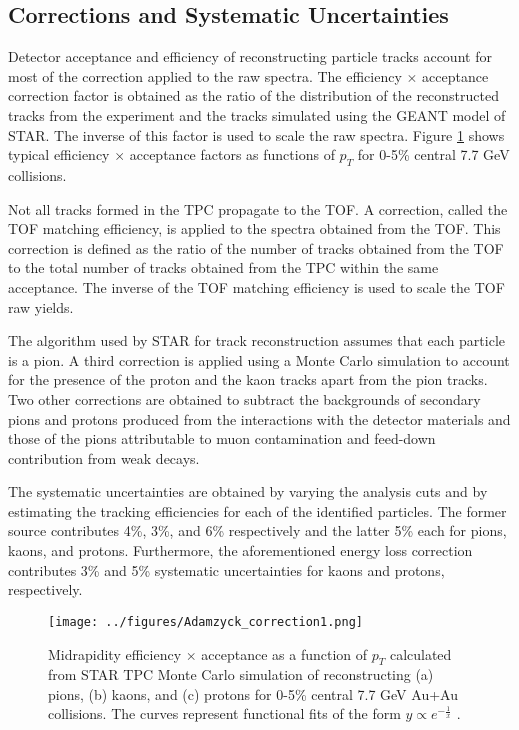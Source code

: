\subsection{Corrections and Systematic Uncertainties}
Detector acceptance and efficiency of reconstructing particle tracks account for most of the correction applied to the raw spectra. The efficiency $\times$ acceptance correction factor is obtained as the ratio of the distribution of the reconstructed tracks from the experiment and the tracks simulated using the GEANT model of STAR. The inverse of this factor is used to scale the raw spectra. Figure \ref{fig:AdamczykCorrection1} shows typical efficiency $\times$ acceptance factors as functions of $p_{T}$ for 0-5\% central 7.7 GeV collisions.

Not all tracks formed in the TPC propagate to the TOF. A correction, called the TOF matching efficiency, is applied to the spectra obtained from the TOF. This correction is defined as the ratio of the number of tracks obtained from the TOF to the total number of tracks obtained from the TPC within the same acceptance. The inverse of the TOF matching efficiency is used to scale the TOF raw yields.

The algorithm used by STAR for track reconstruction assumes that each particle is a pion. A third correction is applied using a Monte Carlo simulation to account for the presence of the proton and the kaon tracks apart from the pion tracks. Two other corrections are obtained to subtract the backgrounds of secondary pions and protons produced from the interactions with the detector materials and those of the pions attributable to muon contamination and feed-down contribution from weak decays.

The systematic uncertainties are obtained by varying the analysis cuts and by estimating the tracking efficiencies for each of the identified particles. The former source contributes 4\%, 3\%, and 6\% respectively and the latter 5\% each for pions, kaons, and protons. Furthermore, the aforementioned energy loss correction contributes 3\% and 5\% systematic uncertainties for kaons and protons, respectively.

\begin{figure}[tb]
  \centering
  \texttt{[image: ../figures/Adamzyck\_correction1.png]}\\
  \caption{Midrapidity efficiency $\times$ acceptance as a function of $p_{T}$ calculated from STAR TPC Monte Carlo simulation of reconstructing (a) pions, (b) kaons, and (c) protons for 0-5\% central 7.7 GeV Au+Au collisions. The curves represent functional fits of the form $y \propto e^{-\frac{1}{x}}$ \cite{PhysRevC.96.044904}.}\label{fig:AdamczykCorrection1}
\end{figure}

